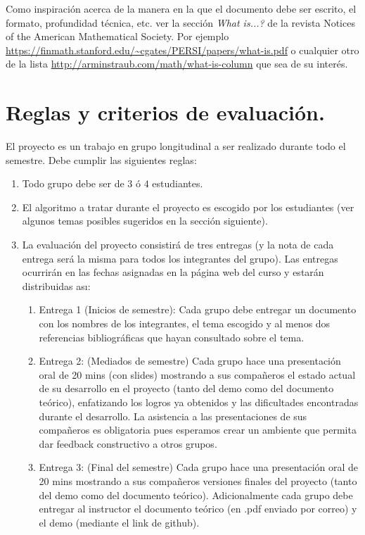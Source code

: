 \documentclass[12pt, a4paper]{article}
\begin{document}
Como inspiraci\'on acerca de la manera en la que el documento debe ser escrito, el formato, profundidad t\'ecnica, etc. ver la secci\'on {\it What is...?} de la revista Notices of the American Mathematical Society. Por ejemplo \url{https://finmath.stanford.edu/~cgates/PERSI/papers/what-is.pdf} o cualquier otro de la lista \url{http://arminstraub.com/math/what-is-column} que sea de su inter\'es.



\section{Reglas y criterios de evaluaci\'on.}
El proyecto es un trabajo en grupo longitudinal a ser realizado durante todo el semestre. Debe cumplir las siguientes reglas:

\begin{enumerate}

\item Todo grupo debe ser de $3$ \'o $4$ estudiantes.
\item El algoritmo a tratar durante el proyecto es escogido por los estudiantes (ver algunos temas posibles sugeridos en la secci\'on siguiente).
\item La evaluaci\'on del proyecto consistir\'a de tres entregas (y la nota de cada entrega ser\'a la misma para todos los integrantes del grupo). Las entregas ocurrir\'an en las fechas asignadas en la p\'agina web del curso y estar\'an distribuidas as\i:
\begin{enumerate}
\item Entrega 1 (Inicios de semestre): Cada grupo debe entregar un documento con los nombres de los integrantes, el tema escogido y al menos dos referencias bibliogr\'aficas que hayan consultado sobre el tema.
\item Entrega 2: (Mediados de semestre) Cada grupo hace una presentaci\'on oral de 20 mins (con slides) mostrando a sus compa\~neros el estado actual de su desarrollo en el proyecto (tanto del demo como del documento te\'orico), enfatizando los logros ya obtenidos y las dificultades encontradas durante el desarrollo. La asistencia a las presentaciones de sus compa\~neros es obligatoria pues esperamos crear un ambiente que permita dar feedback constructivo a otros grupos.
\item Entrega 3: (Final del semestre) Cada grupo hace una presentaci\'on oral de 20 mins mostrando a sus compa\~neros versiones finales del proyecto (tanto del demo como del documento te\'orico).  Adicionalmente cada grupo debe entregar al instructor el documento te\'orico (en .pdf enviado por correo) y el demo (mediante el link de github).
\end{enumerate}
\end{enumerate}
\end{document}
